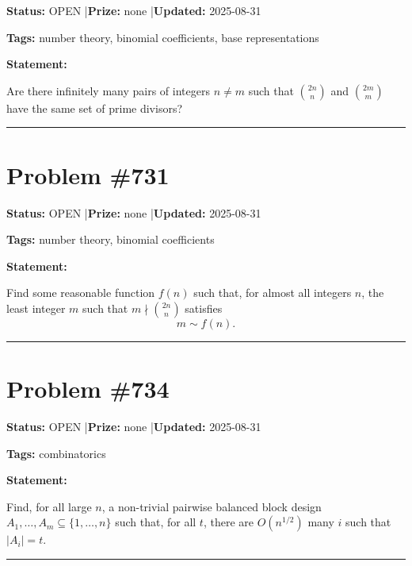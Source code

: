 \documentclass{article}
\begin{document}
\noindent\textbf{Status:} OPEN \quad|\quad \textbf{Prize:} none \quad|\quad \textbf{Updated:} 2025-08-31

\noindent\textbf{Tags:} number theory, binomial coefficients, base representations

\medskip

\noindent\textbf{Statement:}

Are there infinitely many pairs of integers $n\neq m$ such that $\binom{2n}{n}$ and $\binom{2m}{m}$ have the same set of prime divisors?

\noindent\rule{\linewidth}{0.4pt}


\section{Problem \#731}
\label{prob:731}

\noindent\textbf{Status:} OPEN \quad|\quad \textbf{Prize:} none \quad|\quad \textbf{Updated:} 2025-08-31

\noindent\textbf{Tags:} number theory, binomial coefficients

\medskip

\noindent\textbf{Statement:}

Find some reasonable function $f(n)$ such that, for almost all integers $n$, the least integer $m$ such that $m\nmid \binom{2n}{n}$ satisfies\[m\sim f(n).\]

\noindent\rule{\linewidth}{0.4pt}


\section{Problem \#734}
\label{prob:734}

\noindent\textbf{Status:} OPEN \quad|\quad \textbf{Prize:} none \quad|\quad \textbf{Updated:} 2025-08-31

\noindent\textbf{Tags:} combinatorics

\medskip

\noindent\textbf{Statement:}

Find, for all large $n$, a non-trivial pairwise balanced block design $A_1,\ldots,A_m\subseteq \{1,\ldots,n\}$ such that, for all $t$, there are $O(n^{1/2})$ many $i$ such that $\lvert A_i\rvert=t$.

\noindent\rule{\linewidth}{0.4pt}


\end{document}
